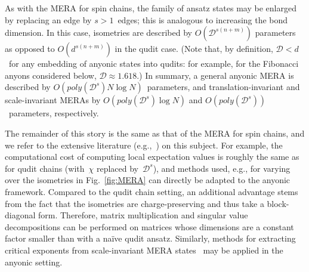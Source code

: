 \documentclass[floats,prb,twocolumn]{revtex4}
\newcommand*{\cD}{\mathscr{D}}
\begin{document}
As with the MERA for spin chains, the family of ansatz states may be enlarged by replacing  an edge by $s>1$~edges; this is analogous to increasing the bond dimension. In this case, isometries are described by $O(\cD^{s(n+m)})$ parameters as opposed to $O(d^{s(n+m)})$ in the qudit case.  (Note that, by definition, $\cD<d$~for  any embedding of anyonic states into qudits: for example, for the Fibonacci anyons considered below, $\cD\approx 1.618$.) In summary, a general anyonic MERA is described by $O(poly(\cD^s)N\log N)$~parameters, and translation-invariant and scale-invariant MERAs by $O(poly(\cD^s)\log N)$ and $O(poly(\cD^s))$~parameters, respectively. 

 
The remainder of this  story is the same as that of the MERA for spin chains, and we refer to the extensive literature (e.g.,~\cite{evenblyvidal09}) on this subject. For example, the computational cost of computing local expectation values is roughly the same as for qudit chains (with~$\chi$ replaced by~$\cD^s$), and methods used, e.g., for varying over the isometries in Fig.~\ref{fig:MERA} can directly be adapted to the anyonic framework. Compared to the qudit chain setting, an additional advantage stems from the fact that the isometries are charge-preserving and thus take a block-diagonal form. Therefore,  matrix multiplication and singular value decompositions can be performed on matrices whose dimensions are a constant factor smaller than with a na\"ive qudit ansatz. Similarly, methods for extracting critical exponents from scale-invariant MERA states~\cite{Montangeroetal09,Pfeiferetal09} may be applied in the anyonic setting.
\end{document}
